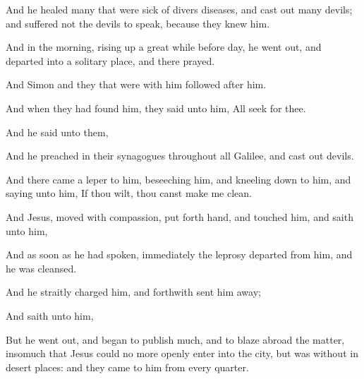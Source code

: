 {And he
healed
many that
were
sick of
divers
diseases,
and cast
out
many
devils;
and
suffered
not the
devils to
speak,
because they
knew
him.

And in the
morning, rising
up a great
while before
day, he went
out,
and
departed
into a
solitary
place, and
there
prayed.

And
Simon
and they that
were
with
him followed
after
him.

And when they had
found
him, they
said unto
him,
All
{} seek
for
thee.

And he
said unto
them,
{}

And
he
preached
in
their
synagogues
throughout
all
Galilee,
and cast
out
devils.

And there
came a
leper
to
him,
beseeching
him,
and kneeling
down to
him,
and
saying unto
him,
If thou
wilt, thou canst
make
me
clean.

And
Jesus, moved with
compassion, put
forth
{}
hand, and
touched
him,
and
saith unto
him,
{}

And as soon
as
he had
spoken,
immediately the
leprosy
departed
from
him,
and he was
cleansed.

And he straitly
charged
him,
and
forthwith
sent
him
away;

And
saith unto
him,
{}

But he went
out, and
began to
publish
{}
much,
and to blaze
abroad the
matter, insomuch
that
Jesus
could no
more
openly
enter
into the
city,
but
was
without
in
desert
places:
and they
came
to
him from every
quarter.




\par }
